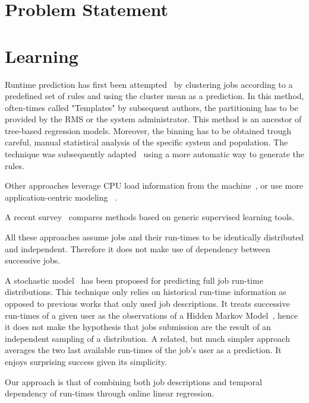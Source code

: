 \documentclass{llncs}
\begin{document}
\section{Problem Statement}
\label{sec:problem_statement}





\section{Learning}
\label{sec:learning}
Runtime prediction has first been attempted~\cite{gibbons} by clustering jobs according to a predefined set of rules and using the cluster mean as a prediction. In this method, often-times called "Templates" by subsequent authors, the partitioning has to be provided by the RMS or the system administrator. This method is an ancestor of tree-based regression models. Moreover, the binning has to be obtained trough careful, manual statistical analysis of the specific system and population. The technique was subsequently adapted~\cite{gibbons-GA} using a more automatic way to generate the rules.

Other approaches leverage CPU load information from the machine~\cite{predict-load}, or use more application-centric modeling ~\cite{Schopf99usingstochastic}\cite{Nadeem:2009:PET:1654059.1654093}\cite{6495803}.

A recent survey~\cite{ML-predictruntime-survey} compares methods based on generic supervised learning tools.

All these approaches assume jobs and their run-times to be identically distributed and independent. Therefore it does not make use of dependency between successive jobs.

A stochastic model~\cite{hmm} has been proposed for predicting full job run-time distributions. This technique only relies on historical run-time information as opposed to previous works that only used job descriptions. It treats successive run-times of a given user as the observations of a Hidden Markov Model~\cite{rabiner}, hence it does not make the hypothesis that jobs submission are the result of an independent sampling of a distribution.
A related, but much simpler approach~\cite{tsafir} averages the two last available run-times of the job's user as a prediction. It enjoys surprising success given its simplicity.

Our approach is that of combining both job descriptions and temporal dependency of run-times through online linear regression.
\end{document}
